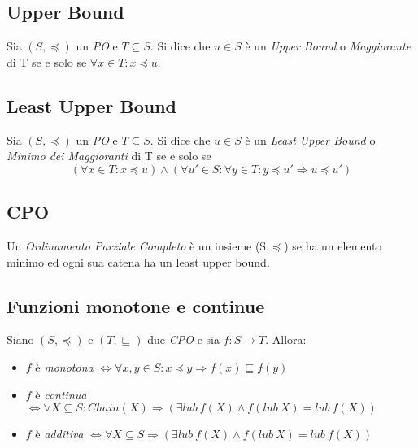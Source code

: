 \subsection{Upper Bound}
\begin{definizione}
  Sia $(S,\preceq)$ un \emph{PO} e $T\subseteq S$. Si dice che $u \in S$ è un \emph{Upper Bound} o \emph{Maggiorante} di T se e solo se $ \forall x \in T : x \preceq u $.
\end{definizione}

\subsection{Least Upper Bound}
\begin{definizione}
  Sia $(S,\preceq)$ un \emph{PO} e $T\subseteq S$. Si dice che $u \in S$ è un \emph{Least Upper Bound} o \emph{Minimo dei Maggioranti} di T se e solo se $$( \forall x \in T : x \preceq u ) \land (\forall u' \in S : \forall y \in T : y \preceq u' \Rightarrow u \preceq u') $$
\end{definizione}

\subsection{CPO}
\begin{definizione}[CPO]
  Un \emph{Ordinamento Parziale Completo} è un insieme (S,$\preceq$) se ha un elemento minimo ed ogni sua catena ha un least upper bound.
\end{definizione}

\subsection{Funzioni monotone e continue}
\begin{definizione}
  Siano $(S,\preceq)$ e $(T,\sqsubseteq)$ due \emph{CPO} e sia $ f:S\rightarrow T$. Allora:
  \begin{itemize}
  \item $f$ è \emph{monotona} $\Leftrightarrow \forall x,y \in S :
    x \preceq y \Rightarrow f(x) \sqsubseteq f(y)$
  \item $f$ è \emph{continua} $\Leftrightarrow \forall X \subseteq S : Chain(X) \Rightarrow (\exists lub\ f(X) \land f(lub\ X) = lub\ f(X))$
  \item $f$ è \emph{additiva} $\Leftrightarrow \forall X \subseteq S \Rightarrow (\exists lub\ f(X) \land f(lub\ X) = lub\ f(X))$
  \end{itemize}
\end{definizione}



